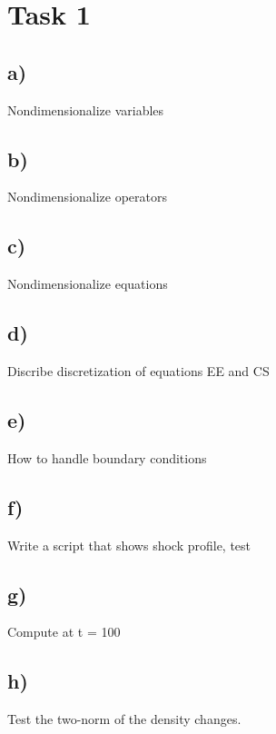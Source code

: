 \documentclass{article}
\begin{document}

\section{Task 1}

\subsection{a)}
Nondimensionalize variables

\subsection{b)}
Nondimensionalize operators

\subsection{c)}
Nondimensionalize equations

\subsection{d)}
Discribe discretization of equations EE and CS

\subsection{e)}
How to handle boundary conditions

\subsection{f)}
Write a script that shows shock profile, test

\subsection{g)}
Compute at t = 100

\subsection{h)}
Test the two-norm of the density changes.
\end{document}
